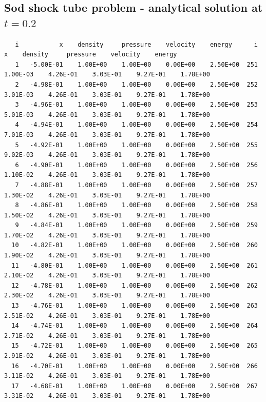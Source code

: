 \documentclass[10pt,letterpaper,notitlepage]{article}
\numberwithin{equation}{section}
\begin{document}
\begin{appendices}
\section{Sod shock tube problem - analytical solution at $t=0.2$} \label{appendix:sodanasol}
{\scriptsize 
\begin{verbatim}
   i           x    density     pressure    velocity    energy      i           x    density     pressure    velocity    energy 
   1   -5.00E-01    1.00E+00    1.00E+00    0.00E+00    2.50E+00  251    1.00E-03    4.26E-01    3.03E-01    9.27E-01    1.78E+00
   2   -4.98E-01    1.00E+00    1.00E+00    0.00E+00    2.50E+00  252    3.01E-03    4.26E-01    3.03E-01    9.27E-01    1.78E+00
   3   -4.96E-01    1.00E+00    1.00E+00    0.00E+00    2.50E+00  253    5.01E-03    4.26E-01    3.03E-01    9.27E-01    1.78E+00
   4   -4.94E-01    1.00E+00    1.00E+00    0.00E+00    2.50E+00  254    7.01E-03    4.26E-01    3.03E-01    9.27E-01    1.78E+00
   5   -4.92E-01    1.00E+00    1.00E+00    0.00E+00    2.50E+00  255    9.02E-03    4.26E-01    3.03E-01    9.27E-01    1.78E+00
   6   -4.90E-01    1.00E+00    1.00E+00    0.00E+00    2.50E+00  256    1.10E-02    4.26E-01    3.03E-01    9.27E-01    1.78E+00
   7   -4.88E-01    1.00E+00    1.00E+00    0.00E+00    2.50E+00  257    1.30E-02    4.26E-01    3.03E-01    9.27E-01    1.78E+00
   8   -4.86E-01    1.00E+00    1.00E+00    0.00E+00    2.50E+00  258    1.50E-02    4.26E-01    3.03E-01    9.27E-01    1.78E+00
   9   -4.84E-01    1.00E+00    1.00E+00    0.00E+00    2.50E+00  259    1.70E-02    4.26E-01    3.03E-01    9.27E-01    1.78E+00
  10   -4.82E-01    1.00E+00    1.00E+00    0.00E+00    2.50E+00  260    1.90E-02    4.26E-01    3.03E-01    9.27E-01    1.78E+00
  11   -4.80E-01    1.00E+00    1.00E+00    0.00E+00    2.50E+00  261    2.10E-02    4.26E-01    3.03E-01    9.27E-01    1.78E+00
  12   -4.78E-01    1.00E+00    1.00E+00    0.00E+00    2.50E+00  262    2.30E-02    4.26E-01    3.03E-01    9.27E-01    1.78E+00
  13   -4.76E-01    1.00E+00    1.00E+00    0.00E+00    2.50E+00  263    2.51E-02    4.26E-01    3.03E-01    9.27E-01    1.78E+00
  14   -4.74E-01    1.00E+00    1.00E+00    0.00E+00    2.50E+00  264    2.71E-02    4.26E-01    3.03E-01    9.27E-01    1.78E+00
  15   -4.72E-01    1.00E+00    1.00E+00    0.00E+00    2.50E+00  265    2.91E-02    4.26E-01    3.03E-01    9.27E-01    1.78E+00
  16   -4.70E-01    1.00E+00    1.00E+00    0.00E+00    2.50E+00  266    3.11E-02    4.26E-01    3.03E-01    9.27E-01    1.78E+00
  17   -4.68E-01    1.00E+00    1.00E+00    0.00E+00    2.50E+00  267    3.31E-02    4.26E-01    3.03E-01    9.27E-01    1.78E+00

\end{verbatim}}
\end{appendices}
\end{document}
